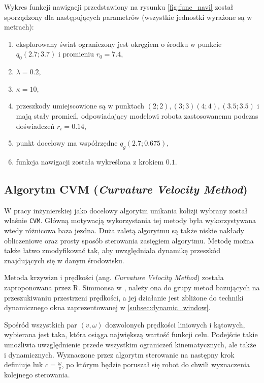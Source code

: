 	Wykres funkcji nawigacji przedstawiony na rysunku \ref{fig:func_navi} został sporządzony dla następujących parametrów (wszystkie jednostki wyrażone są w metrach):
	\begin{enumerate}
	\item eksplorowany świat ograniczony jest okręgiem o środku w punkcie $q_0(2.7;3.7)$ i promieniu $r_0 = 7.4$,
	\item $\lambda = 0.2$,
	\item $\kappa = 10$,
	\item przeszkody umiejscowione są w punktach $(2;2),(3;3)(4;4),(3.5;3.5)$ i mają stały promień, odpowiadający modelowi robota
	zastosowanemu podczas doświadczeń $r_i = 0.14 $,
	\item punkt docelowy ma współrzędne $q_g(2.7;0.675)$,
	\item funkcja nawigacji została wykreślona z krokiem $0.1$.
	\end{enumerate}

\subsection{Algorytm CVM (\textit{Curvature Velocity Method})}
	W pracy inżynierskiej \cite{inzynierka} jako docelowy algorytm unikania kolizji wybrany został właśnie \texttt{CVM}.
	Główną motywacją wykorzystania tej metody była wykorzystywana wtedy różnicowa baza jezdna. Duża zaletą algorytmu są także niskie nakłady obliczeniowe oraz prosty sposób
	sterowania zasięgiem algorytmu. Metodę można także łatwo zmodyfikować tak, aby uwzględniała dynamikę przeszkód znajdujących się w danym środowisku.

	Metoda krzywizn i prędkości (ang. \textit{Curvature Velocity Method}) została zaproponowana przez R. Simmonsa w
	\cite{CVM_2}, należy ona do grupy metod bazujących na przeszukiwaniu przestrzeni prędkości, a jej działanie
	jest zbliżone do techniki dynamicznego okna zaprezentowanej w \ref{subsec:dynamic_window}.

	Spośród wszystkich par $(v,\omega)$ dozwolonych prędkości liniowych i kątowych, wybierana jest taka, która osiąga największą wartość funkcji celu.
	Podejście takie umożliwia uwzględnienie przede wszystkim ograniczeń kinematycznych, ale także i dynamicznych.
	Wyznaczone przez algorytm sterowanie na następny krok definiuje łuk $c=\frac{\omega}{v}$, po którym będzie
	poruszał się robot do chwili wyznaczenia kolejnego sterowania.
	
